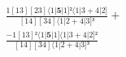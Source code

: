 \documentclass[varwidth, border=5pt]{standalone}
\begin{document}
\begin{my}
$\begin{gathered}
\scriptscriptstyle\frac{1[13][23]⟨1|𝟓|1]²⟨1|3+4|2]}{[14][34]⟨1|2+4|3]³} +\\
\scriptscriptstyle\frac{-1[13]²⟨1|𝟓|1]⟨1|3+4|2]²}{[14][34]⟨1|2+4|3]³} \phantom{+}
\end{gathered}$
\end{my}
\end{document}
